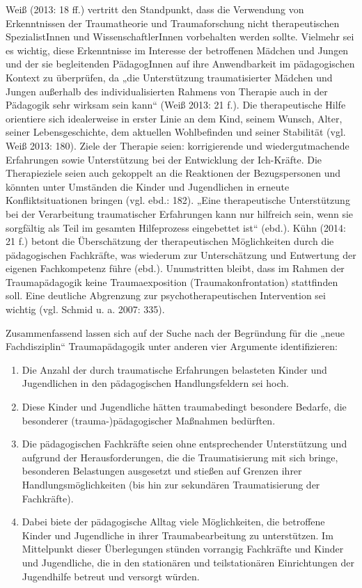 Weiß (2013: 18 ff.) vertritt den Standpunkt, dass die Verwendung von Erkenntnissen der Traumatheorie und Traumaforschung nicht therapeutischen SpezialistInnen und WissenschaftlerInnen vorbehalten werden sollte. Vielmehr sei es wichtig, diese Erkenntnisse im Interesse der betroffenen M{\"a}dchen und Jungen und der sie begleitenden P{\"a}dagogInnen auf ihre Anwendbarkeit im pädagogischen Kontext zu {\"u}berpr{\"u}fen, da „die Unterst{\"u}tzung traumatisierter M{\"a}dchen und Jungen außerhalb des individualisierten Rahmens von Therapie auch in der P{\"a}dagogik sehr wirksam sein kann“ (Weiß 2013: 21 f.). Die therapeutische Hilfe orientiere sich idealerweise in erster Linie an dem Kind, seinem Wunsch, Alter, seiner Lebensgeschichte, dem aktuellen Wohlbefinden und seiner Stabilität (vgl. Weiß 2013: 180). Ziele der Therapie seien: korrigierende und wiedergutmachende Erfahrungen sowie Unterstützung bei der Entwicklung der Ich-Kräfte. Die Therapieziele seien auch gekoppelt an die Reaktionen der Bezugspersonen und könnten unter Umständen die Kinder und Jugendlichen in erneute Konfliktsituationen bringen (vgl. ebd.: 182). „Eine therapeutische Unterstützung bei der Verarbeitung traumatischer Erfahrungen kann nur hilfreich sein, wenn sie sorgfältig als Teil im gesamten Hilfeprozess eingebettet ist“ (ebd.). Kühn (2014: 21 f.) betont die Überschätzung der therapeutischen Möglichkeiten durch die pädagogischen Fachkräfte, was wiederum zur Unterschätzung und Entwertung der eigenen Fachkompetenz führe (ebd.). Unumstritten bleibt, dass im Rahmen der Traumap{\"a}dagogik keine Traumaexposition (Traumakonfrontation) stattfinden soll. Eine deutliche Abgrenzung zur psychotherapeutischen Intervention sei wichtig (vgl. Schmid u. a. 2007: 335).

Zusammenfassend lassen sich auf der Suche nach der Begründung für die „neue Fachdisziplin“ Traumapädagogik unter anderen vier Argumente identifizieren:

\begin{enumerate}
\item Die Anzahl der durch traumatische Erfahrungen belasteten Kinder und Jugendlichen in den pädagogischen Handlungsfeldern sei hoch.  
\item Diese Kinder und Jugendliche hätten traumabedingt besondere Bedarfe, die besonderer (trauma-)pädagogischer Maßnahmen bedürften.  
\item Die pädagogischen Fachkräfte seien ohne entsprechender Unterstützung und aufgrund der Herausforderungen, die die Traumatisierung mit sich bringe, besonderen Belastungen ausgesetzt und stießen auf Grenzen ihrer Handlungsmöglichkeiten (bis hin zur sekundären Traumatisierung der Fachkräfte).  
\item Dabei biete der pädagogische Alltag viele Möglichkeiten, die betroffene Kinder und Jugendliche in ihrer Traumabearbeitung zu unterstützen. Im Mittelpunkt dieser Überlegungen stünden vorrangig Fachkräfte und Kinder und Jugendliche, die in den stationären und teilstation{\"a}ren Einrichtungen der Jugendhilfe betreut und versorgt würden.
\end{enumerate}
